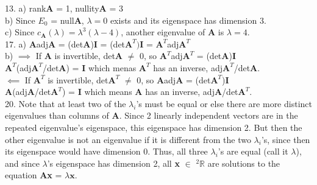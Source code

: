 \documentclass{article}
\begin{document}
    13. a) rank\textbf{A} = 1, nullity\textbf{A} = 3\\
    b) Since $\textit{E}_0$ = null\textbf{A}, $\lambda = 0$ exists and its eigenspace has dimension 3.\\
    c) Since $c_{\textbf{A}}(\lambda) = \lambda^3(\lambda - 4)$, another eigenvalue of \textbf{A} is $\lambda = 4$.\\

    17. a) \textbf{A}adj\textbf{A} = (det\textbf{A})\textbf{I} = (det$\textbf{A}^T)\textbf{I}$ = $\textbf{A}^T$adj$\textbf{A}^T$\\
    b) $\implies$ If \textbf{A} is invertible, det\textbf{A} $\neq$ 0, so $\textbf{A}^T$adj$\textbf{A}^T$ = (det\textbf{A})\textbf{I}\\
  $\textbf{A}^T$(adj$\textbf{A}^T$/det$\textbf{A}$) = \textbf{I} which menas $\textbf{A}^T$ has an inverse, adj$\textbf{A}^T$/det$\textbf{A}$.\\
  $\impliedby$ If $\textbf{A}^T$ is invertible, det$\textbf{A}^T$ $\neq$ 0, so \textbf{A}adj\textbf{A} = (det$\textbf{A}^T$)\textbf{I}\\
    \textbf{A}(adj\textbf{A}/det$\textbf{A}^T$) = \textbf{I} which means \textbf{A} has an inverse, adj\textbf{A}/det$\textbf{A}^T$.\\

    20. Note that at least two of the $\lambda_i$'s must be equal or else there are more distinct eigenvalues than columns of \textbf{A}. Since 2 linearly independent vectors are in the repeated eigenvalue's eigenspace, this eigenspace has dimension 2. But then the other eigenvalue is not an eigenvalue if it is different from the two $\lambda_i$'s, since then its eigenspace would have dimension 0. Thus, all three $\lambda_i$'s are equal (call it $\lambda$), and since $\lambda$'s eigenspace has dimension 2, all \textbf{x} $\in$ $^2\mathbb{R}$  are solutions to the equation \textbf{Ax} = $\lambda\textbf{x}$.
\end{document}
